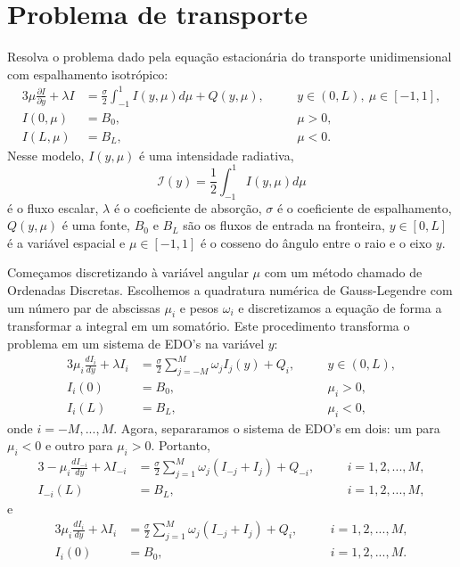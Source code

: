 \section{Problema de transporte}
\begin{ex}\label{transp_3}Resolva o problema dado pela equação estacionária do transporte unidimensional com espalhamento isotrópico:
\begin{alignat*}{3}
\mu\frac{\partial I}{\partial y}+\lambda I&=\frac{\sigma}{2}\int_{-1}^1 I(y,\mu)d\mu+Q(y,\mu), & &y\in (0,L),\ \mu\in[-1,1],\\
I(0,\mu)&=B_0, & &\mu>0,\\
I(L,\mu)&=B_L, &\quad &\mu<0.
\end{alignat*}
Nesse modelo, $I(y,\mu)$ é uma intensidade radiativa, 
$$
\mathcal{I}(y)=\frac{1}{2}\int_{-1}^1 I(y,\mu)d\mu
$$
é o fluxo escalar, $\lambda$ é o coeficiente de absorção, $\sigma$ é o coeficiente de espalhamento, $Q(y,\mu)$ é uma fonte, $B_0$ e $B_L$ são os fluxos de entrada na fronteira, $y\in[0,L]$ é a variável espacial e $\mu\in[-1,1]$ é o cosseno do ângulo entre o raio e o eixo $y$.
\end{ex}
Começamos discretizando à variável angular $\mu$ com um método chamado de Ordenadas Discretas. Escolhemos a quadratura numérica de Gauss-Legendre com um número par de abscissas $\mu_i$ e pesos $\omega_i$ e discretizamos a equação de forma a transformar a integral em um somatório. Este procedimento transforma o problema em um sistema de EDO's na variável $y$:
\begin{alignat*}{3}
\mu_i \frac{dI_i}{d y}+\lambda I_i&=\frac{\sigma}{2}\sum_{j=-M}^M\omega_jI_j(y)+Q_{ i}, & &y\in (0,L),\\
I_i(0)&=B_0, & &\mu_i>0,\\
I_i(L)&=B_L, &\quad &\mu_i<0,
\end{alignat*}
onde $i=-M,...,M$. Agora, separaramos o sistema de EDO's em dois: um para $\mu_i<0$ e outro para $\mu_i>0$. Portanto, 
\begin{alignat*}{3}
-\mu_i\frac{dI_{-i}}{d y}+\lambda I_{-i} &=\frac{\sigma}{2}\sum_{j=1}^{M}\omega_j(I_{-j}+I_{j})+Q_{- i}, &\quad &i=1,2,...,M,\\
I_{-i}(L)&=B_L, &\quad &i=1,2,...,M,
\end{alignat*}
e
\begin{alignat*}{3}
\mu_i \frac{dI_{i}}{d y}+\lambda I_i &=\frac{\sigma}{2}\sum_{j=1}^{M}\omega_j(I_{-j}+I_{j})+Q_{ i}, &\quad &i=1,2,...,M,\\
I_i(0)&=B_0, &\quad &i=1,2,...,M.
\end{alignat*}
